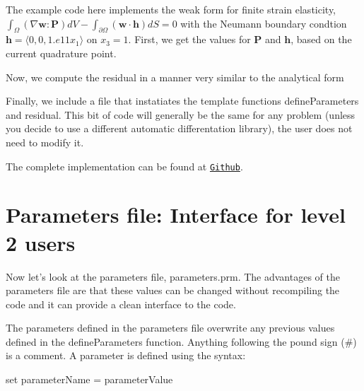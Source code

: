 The example code here implements the weak form for finite strain elasticity, $\int_\Omega (\nabla{\boldsymbol{w}}:\boldsymbol{P}) dV - \int_{\partial\Omega} (\boldsymbol{w}\cdot\boldsymbol{h}) dS = 0$ with the Neumann boundary condtion $\boldsymbol{h} = \langle 0,0,1.e11x_1\rangle$ on $x_3=1$. First, we get the values for $\boldsymbol{P}$ and $\boldsymbol{h}$, based on the current quadrature point.


\begin{DoxyCodeInclude}

\end{DoxyCodeInclude}


Now, we compute the residual in a manner very similar to the analytical form


\begin{DoxyCodeInclude}

\end{DoxyCodeInclude}


Finally, we include a file that instatiates the template functions {\ttfamily define\-Parameters} and {\ttfamily residual}. This bit of code will generally be the same for any problem (unless you decide to use a different automatic differentation library), the user does not need to modify it.


\begin{DoxyCodeInclude}

\end{DoxyCodeInclude}


The complete implementation can be found at \href{https://github.com/mechanoChem/mechanoChemIGA/blob/master/initBounValProbs/nonGradientMechanics/3D/userFunctions.cc}{\tt Github}.

\section*{Parameters file\-: Interface for level 2 users }

Now let's look at the parameters file, {\ttfamily parameters.\-prm}. The advantages of the parameters file are that these values can be changed without recompiling the code and it can provide a clean interface to the code. 

The parameters defined in the parameters file overwrite any previous values defined in the {\ttfamily define\-Parameters} function. Anything following the pound sign (\#) is a comment. A parameter is defined using the syntax\-:

{\ttfamily set} {\ttfamily parameter\-Name} {\ttfamily =} {\ttfamily parameter\-Value} 

